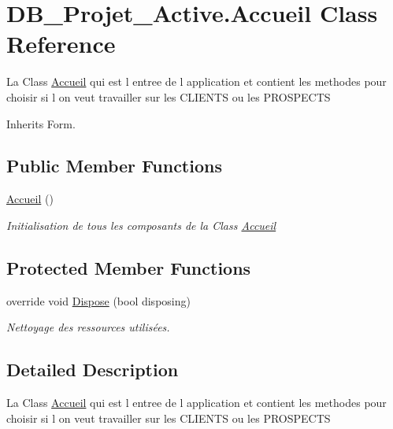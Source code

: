 \hypertarget{class_d_b___projet___active_1_1_accueil}{}\section{D\+B\+\_\+\+Projet\+\_\+\+Active.\+Accueil Class Reference}
\label{class_d_b___projet___active_1_1_accueil}


La Class \mbox{\hyperlink{class_d_b___projet___active_1_1_accueil}{Accueil}} qui est l entree de l application et contient les methodes pour choisir si l on veut travailler sur les C\+L\+I\+E\+N\+TS ou les P\+R\+O\+S\+P\+E\+C\+TS  




Inherits Form.

\subsection*{Public Member Functions}
\begin{DoxyCompactItemize}
\item 
\mbox{\hyperlink{class_d_b___projet___active_1_1_accueil_a92cda60f41572a1a2c3c24eeb6376821}{Accueil}} ()
\begin{DoxyCompactList}\small\item\em Initialisation de tous les composants de la Class \mbox{\hyperlink{class_d_b___projet___active_1_1_accueil}{Accueil}} \end{DoxyCompactList}\end{DoxyCompactItemize}
\subsection*{Protected Member Functions}
\begin{DoxyCompactItemize}
\item 
override void \mbox{\hyperlink{class_d_b___projet___active_1_1_accueil_a493877105848f55b96ea494895acb0a6}{Dispose}} (bool disposing)
\begin{DoxyCompactList}\small\item\em Nettoyage des ressources utilisées. \end{DoxyCompactList}\end{DoxyCompactItemize}


\subsection{Detailed Description}
La Class \mbox{\hyperlink{class_d_b___projet___active_1_1_accueil}{Accueil}} qui est l entree de l application et contient les methodes pour choisir si l on veut travailler sur les C\+L\+I\+E\+N\+TS ou les P\+R\+O\+S\+P\+E\+C\+TS 

